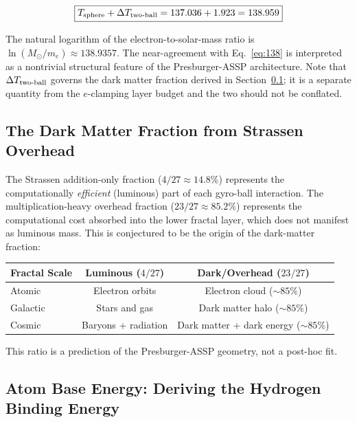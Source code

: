\documentclass[11pt,a4paper]{article}
\begin{document}
\begin{equation}
\boxed{
  T_{\rm sphere} + \Delta T_{\rm two\text{-}ball}
  = 137.036 + 1.923 = 138.959
}
\label{eq:138}
\end{equation}

The natural logarithm of the electron-to-solar-mass ratio is $\ln(M_\odot/m_e) \approx 138.9357$. The near-agreement with Eq.~\eqref{eq:138} is interpreted as a nontrivial structural feature of the Presburger-ASSP architecture. Note that $\Delta T_{\rm two\text{-}ball}$ governs the dark matter fraction derived in Section~\ref{sec:dm}; it is a separate quantity from the $e$-clamping layer budget and the two should not be conflated.

\subsection{The Dark Matter Fraction from Strassen Overhead}
\label{sec:dm}

The Strassen addition-only fraction ($4/27 \approx 14.8\%$) represents the computationally \emph{efficient} (luminous) part of each gyro-ball interaction. The multiplication-heavy overhead fraction ($23/27 \approx 85.2\%$) represents the computational cost absorbed into the lower fractal layer, which does not manifest as luminous mass. This is conjectured to be the origin of the dark-matter fraction:

\begin{table}[h]
\centering
\begin{tabular}{|l|c|c|}
\hline
\textbf{Fractal Scale} & \textbf{Luminous ($4/27$)} &
  \textbf{Dark/Overhead ($23/27$)} \\
\hline
Atomic    & Electron orbits  & Electron cloud ($\sim85\%$) \\
Galactic  & Stars and gas    & Dark matter halo ($\sim85\%$) \\
Cosmic    & Baryons + radiation & Dark matter + dark energy ($\sim85\%$) \\
\hline
\end{tabular}
\end{table}

This ratio is a prediction of the Presburger-ASSP geometry, not a post-hoc fit.

\subsection{Atom Base Energy: Deriving the Hydrogen Binding Energy}
\end{document}
